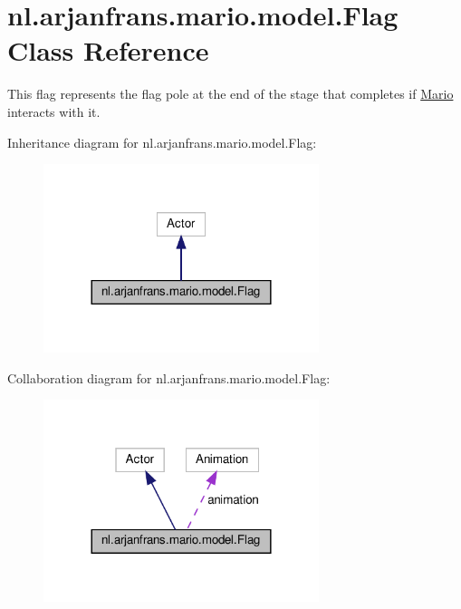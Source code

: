 \hypertarget{classnl_1_1arjanfrans_1_1mario_1_1model_1_1Flag}{}\section{nl.\+arjanfrans.\+mario.\+model.\+Flag Class Reference}
\label{classnl_1_1arjanfrans_1_1mario_1_1model_1_1Flag}


This flag represents the flag pole at the end of the stage that completes if \hyperlink{classnl_1_1arjanfrans_1_1mario_1_1model_1_1Mario}{Mario} interacts with it.  




Inheritance diagram for nl.\+arjanfrans.\+mario.\+model.\+Flag\+:\nopagebreak
\begin{figure}[H]
\begin{center}
\leavevmode
\includegraphics[width=228pt]{classnl_1_1arjanfrans_1_1mario_1_1model_1_1Flag__inherit__graph}
\end{center}
\end{figure}


Collaboration diagram for nl.\+arjanfrans.\+mario.\+model.\+Flag\+:\nopagebreak
\begin{figure}[H]
\begin{center}
\leavevmode
\includegraphics[width=228pt]{classnl_1_1arjanfrans_1_1mario_1_1model_1_1Flag__coll__graph}
\end{center}
\end{figure}
